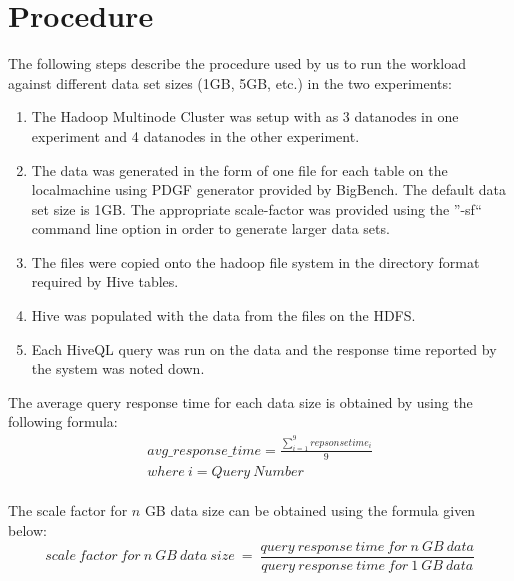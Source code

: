 \documentclass[12pt]{book}
\begin{document}
\section{Procedure}
The following steps describe the procedure used by us to run the workload against different data set sizes (1GB, 5GB, etc.) in the two experiments:
\begin{enumerate}
 \item The Hadoop Multinode Cluster was setup with as 3 datanodes in one experiment and 4 datanodes in the other experiment.
 \item The data was generated in the form of one file for each table on the localmachine using PDGF generator provided by BigBench. The default data 
 set size is 1GB. The appropriate scale-factor was provided using the ''-sf`` command line option in order to generate larger data sets. 
 \item The files were copied onto the hadoop file system in the directory format required by Hive tables.
 \item Hive was populated with the data from the files on the HDFS.
 \item Each HiveQL query was run on the data and the response time reported by the system was noted down.
\end{enumerate}
The average query response time for each data size is obtained by using the following formula:
\\\noindent
\begin{eqnarray*}
 avg\_response\_time =  \frac{\sum_{i=1}^{9} repsonsetime_{i}}{9}
 \\
 where \ i = Query\ Number
\end{eqnarray*}
\\\noindent
The scale factor for $n$ GB data size can be obtained using the formula given below:
\begin{equation}
scale\ factor\ for\ n\ GB\ data\ size\ =\ \frac{query\ response\ time\ for\ n\ GB\ data}{query\ response\ time\ for\ 1\ GB\ data}
\end{equation}



\end{document}
